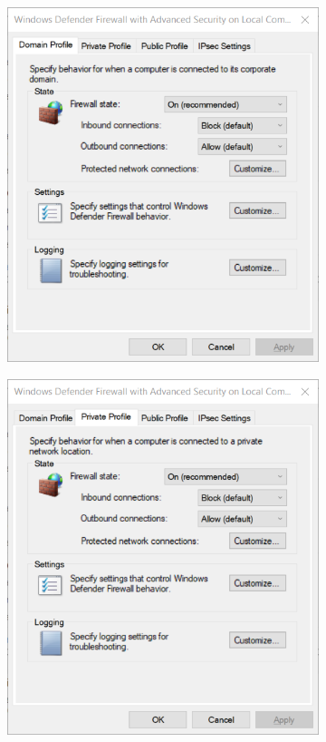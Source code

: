 \begin{enumerate}
\begin{figure}[H]
\begin{subfigure}[b]{0.3\textwidth}
            \includegraphics[width=\textwidth]{figures/pic5.png}
        \end{subfigure}
        \begin{subfigure}[b]{0.3\textwidth}
            \centering
            \includegraphics[width=\textwidth]{figures/pic6.png}

\end{subfigure}
\end{figure}
\end{enumerate}
